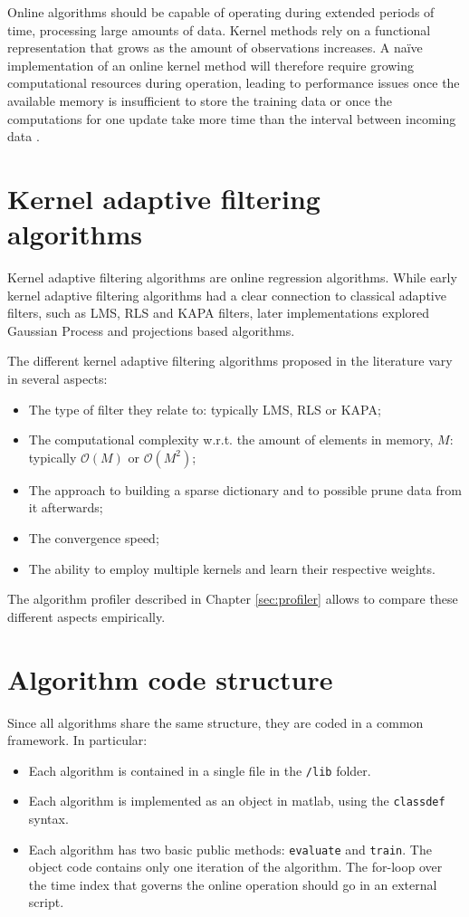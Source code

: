 \documentclass[]{report}
\begin{document}
Online algorithms should be capable of operating during extended periods of time, processing large amounts of data. Kernel methods rely on a functional representation that grows as the amount of observations increases. A na\"ive implementation of an online kernel method will therefore require growing computational resources during operation, leading to performance issues once the available memory is insufficient to store the training data or once the computations for one update take more time than the interval between incoming data \cite{kivinen2004online}.


\section{Kernel adaptive filtering algorithms}

Kernel adaptive filtering algorithms are online regression algorithms. While early kernel adaptive filtering algorithms had a clear connection to classical adaptive filters, such as LMS, RLS and KAPA filters, later implementations explored Gaussian Process and projections based algorithms.

The different kernel adaptive filtering algorithms proposed in the literature vary in several aspects:
\begin{itemize}
\item The type of filter they relate to: typically LMS, RLS or KAPA;
\item The computational complexity w.r.t. the amount of elements in memory, $M$: typically $\mathcal{O}(M)$ or $\mathcal{O}(M^2)$;
\item The approach to building a sparse dictionary and to possible prune data from it afterwards;
\item The convergence speed;
\item The ability to employ multiple kernels and learn their respective weights.
\end{itemize}
The algorithm profiler described in Chapter \ref{sec:profiler} allows to compare these different aspects empirically.

\section{Algorithm code structure}

Since all algorithms share the same structure, they are coded in a common framework. In particular:
\begin{itemize}
\item Each algorithm is contained in a single file in the \verb"/lib" folder.
\item Each algorithm is implemented as an object in matlab, using the \verb"classdef" syntax.
\item Each algorithm has two basic public methods: \verb"evaluate" and \verb"train".
The object code contains only one iteration of the algorithm. The for-loop over the time index that governs the online operation should go in an external script.
\end{itemize}
\end{document}
